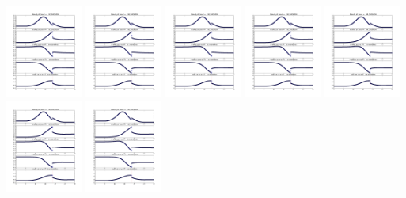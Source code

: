\documentclass[11pt]{article}
\begin{document}
\vskip 10pt 
\includegraphics[width=0.19\textwidth]{frame0090fig1.png}
\vskip 10pt 
\includegraphics[width=0.19\textwidth]{frame0091fig1.png}
\vskip 10pt 
\includegraphics[width=0.19\textwidth]{frame0092fig1.png}
\vskip 10pt 
\includegraphics[width=0.19\textwidth]{frame0093fig1.png}
\vskip 10pt 
\includegraphics[width=0.19\textwidth]{frame0094fig1.png}
\vskip 10pt 
\includegraphics[width=0.19\textwidth]{frame0095fig1.png}
\vskip 10pt 
\includegraphics[width=0.19\textwidth]{frame0096fig1.png}
\end{document}
